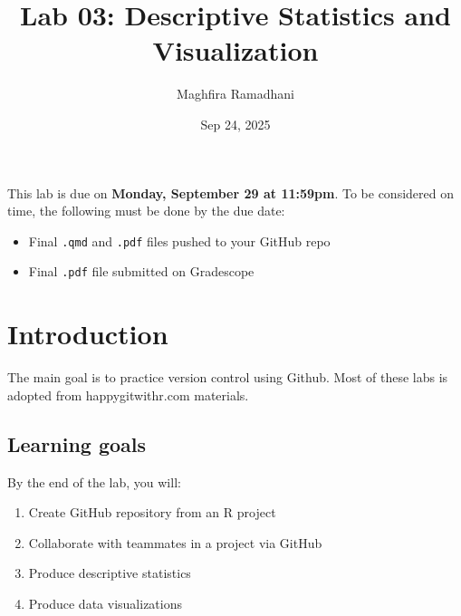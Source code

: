 \documentclass[
  letterpaper,
  DIV=11,
  numbers=noendperiod]{scrartcl}
\title{Lab 03: Descriptive Statistics and Visualization}
\author{Maghfira Ramadhani}
\date{Sep 24, 2025}
\providecommand{\tightlist}{%
  \setlength{\itemsep}{0pt}\setlength{\parskip}{0pt}}
\begin{document}
\maketitle


\begin{tcolorbox}[enhanced jigsaw, leftrule=.75mm, bottomtitle=1mm, breakable, colback=white, toprule=.15mm, toptitle=1mm, left=2mm, colbacktitle=quarto-callout-important-color!10!white, colframe=quarto-callout-important-color-frame, opacitybacktitle=0.6, titlerule=0mm, coltitle=black, opacityback=0, title=\textcolor{quarto-callout-important-color}{\faExclamation}\hspace{0.5em}{Due date}, arc=.35mm, rightrule=.15mm, bottomrule=.15mm]

This lab is due on \textbf{Monday, September 29 at 11:59pm}. To be
considered on time, the following must be done by the due date:

\begin{itemize}
\tightlist
\item
  Final \texttt{.qmd} and \texttt{.pdf} files pushed to your GitHub repo
\item
  Final \texttt{.pdf} file submitted on Gradescope
\end{itemize}

\end{tcolorbox}

\section{Introduction}\label{introduction}

The main goal is to practice version control using Github. Most of these
labs is adopted from happygitwithr.com materials.

\subsection{Learning goals}\label{learning-goals}

By the end of the lab, you will:

\begin{enumerate}
\def\labelenumi{\arabic{enumi}.}
\item
  Create GitHub repository from an R project
\item
  Collaborate with teammates in a project via GitHub
\item
  Produce descriptive statistics
\item
  Produce data visualizations
\end{enumerate}
\end{document}
